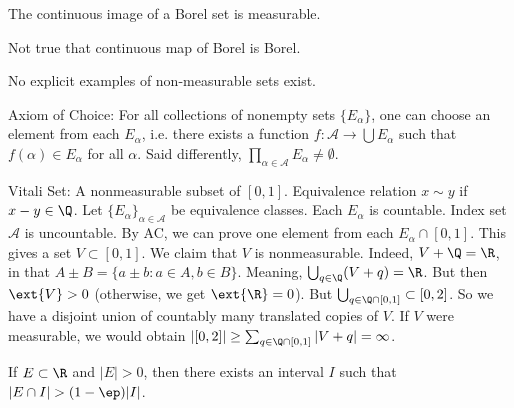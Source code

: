 

\begin{thm}
The continuous image of a Borel set is measurable. 
\end{thm}



Not true that continuous map of Borel is Borel. 


No explicit examples of non-measurable sets exist. 


Axiom of Choice: For all collections of nonempty sets $\{E_\alpha\}$, one can choose an element from each $E_\alpha$, i.e. there exists a function $f: \mathcal{A} \to \bigcup E_\alpha$ such that $f(\alpha) \in E_\alpha$ for all $\alpha$. Said differently, $\prod_{\alpha \in \mathcal{A}} E_\alpha \neq \emptyset$. 



Vitali Set: A nonmeasurable subset of $[0,1]$. Equivalence relation $x \sim y$ if $x-y \in \Q$. Let $\{E_\alpha\}_{\alpha \in \mathcal{A}}$ be equivalence classes. Each $E_\alpha$ is countable. Index set $\mathcal{A}$ is uncountable. By AC, we can prove one element from each $E_\alpha \cap [0,1]$. This gives a set $V \subset [0,1]$. We claim that $V$ is nonmeasurable. Indeed, $V+\Q=\R$, in that $A \pm B =\{ a \pm b \colon a \in A, b \in B\}$. Meaning, $\bigcup_{q \in \Q} (V+q)=\R$. But then $\ext{V}>0$ (otherwise, we get $\ext{\R}=0$). But $\bigcup_{q \in \Q \cap [0,1]} \subset [0,2]$. So we have a disjoint union of countably many translated copies of $V$. If $V$ were measurable, we would obtain $|[0,2]| \geq \sum_{q \in \Q \cap [0,1]} |V+q|= \infty$. 



\begin{lem} \label{lem:density}
If $E \subset \R$ and $|E|>0$, then there exists an interval $I$ such that $|E \cap I|> (1-\ep) |I|$. 
\end{lem}

